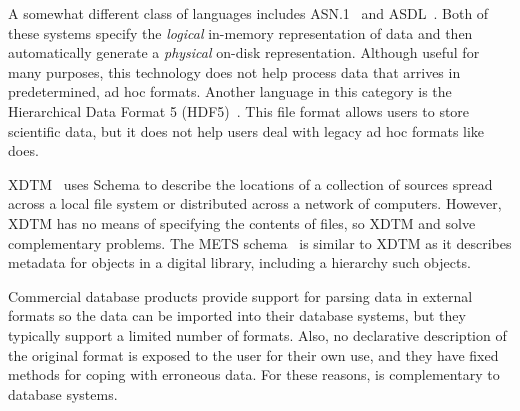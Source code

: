 A somewhat different class of languages includes
\textsc{ASN.1}~\cite{asn} and \textsc{ASDL}~\cite{asdl}.  Both of
these systems specify the {\em logical\/} in-memory representation of
data and then automatically generate a {\em physical\/} on-disk
representation.  Although useful for many purposes, this technology
does not help process data that arrives in predetermined, ad hoc
formats.  Another language in this category is the Hierarchical Data
Format 5 (HDF5)~\cite{hdf5}.  This file format allows users to store
scientific data, but it does not help users deal with legacy ad hoc
formats like \padsml{} does.


XDTM~\cite{xdtm,zhao+:sigmod05} uses \xml{} Schema to describe the
locations of a collection of sources spread across a local file system
or distributed across a network of computers.  However, XDTM has no
means of specifying the contents of files, so XDTM and \padsml{} solve
complementary problems.  The METS schema~\cite{mets} is similar to XDTM as
it describes metadata for objects in a digital library, including a
hierarchy such objects.

Commercial database products provide support for
parsing data in external formats so the data can be imported into
their database systems, but they typically support a limited number of
formats.  Also, no declarative description of the
original format is exposed to the user for their own use, and they
have fixed methods for coping with erroneous data.  For these reasons,
\padsml{} is complementary to database systems.  

